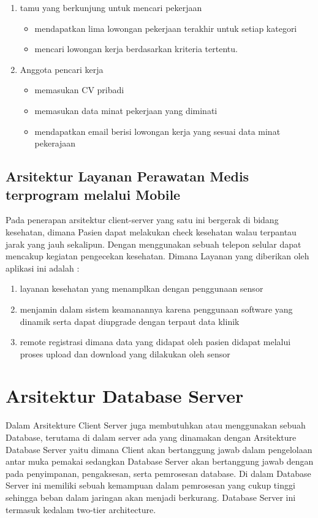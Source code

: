 {\begin{enumerate}
    \item tamu yang berkunjung untuk mencari pekerjaan 
    \begin{itemize}
        \item mendapatkan lima lowongan pekerjaan terakhir untuk setiap kategori
        \item mencari lowongan kerja berdasarkan kriteria tertentu.
    \end{itemize}
    \item Anggota pencari kerja
    \begin{itemize}
        \item memasukan CV pribadi
        \item memasukan data minat pekerjaan yang diminati
        \item mendapatkan email berisi lowongan kerja yang sesuai data minat pekerajaan
    \end{itemize}
\end{enumerate}

\subsection{Arsitektur Layanan Perawatan Medis terprogram melalui Mobile}
Pada penerapan arsitektur client-server yang satu ini bergerak di bidang kesehatan, dimana Pasien dapat melakukan check kesehatan
walau terpantau jarak yang jauh sekalipun. Dengan menggunakan sebuah telepon selular dapat mencakup kegiatan pengecekan kesehatan.
Dimana Layanan yang diberikan oleh aplikasi ini adalah :
\begin{enumerate}
    \item layanan kesehatan yang menamplkan dengan penggunaan sensor
    \item menjamin dalam sistem keamanannya karena penggunaan software yang dinamik serta dapat diupgrade dengan terpaut data klinik
    \item remote registrasi dimana data yang didapat oleh pasien didapat melalui proses upload dan download yang dilakukan oleh sensor
\end{enumerate}

\section{Arsitektur Database Server}
Dalam Arsitekture Client Server juga membutuhkan atau menggunakan sebuah Database, terutama di dalam server ada yang
dinamakan dengan Arsitekture Database Server yaitu dimana Client akan bertanggung jawab dalam pengelolaan antar muka pemakai
sedangkan Database Server akan bertanggung jawab dengan pada penyimpanan, pengaksesan, serta pemrosesan database.
Di dalam Database Server ini memiliki sebuah kemampuan dalam pemrosesan yang cukup tinggi sehingga beban dalam jaringan akan 
menjadi berkurang. Database Server ini termasuk kedalam two-tier architecture.

}
